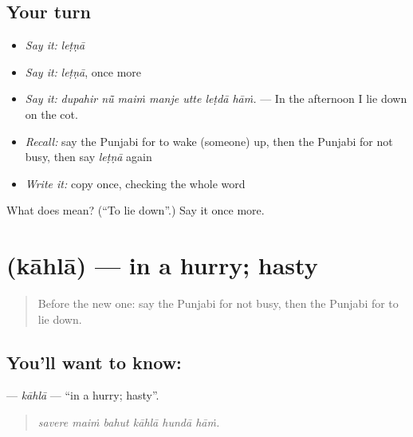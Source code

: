 \subsection*{Your turn}
\begin{itemize}
\raggedright
  \item \emph{Say it:} \emph{leṭṇā}
  \item \emph{Say it:} \emph{leṭṇā}, once more
  \item \emph{Say it:} \emph{dupahir nū̃ maiṁ manje utte leṭdā hāṁ.} — In the afternoon I lie down on the cot.
  \item \emph{Recall:} say the Punjabi for to wake (someone) up, then the Punjabi for not busy, then say \emph{leṭṇā} again
  \item \emph{Write it:} copy \textbf{} once, checking the whole word
\end{itemize}

\begin{tcolorbox}[breakable,colback=teal!4,colframe=teal!35!black,title={Before you move on}]
What does  mean? (\textquotedblleft{}To lie down\textquotedblright{}.) Say it once more.
\end{tcolorbox}
\section[\texorpdfstring{\pa{ਕਾਹਲਾ} (kāhlā)}{ਕਾਹਲਾ (kāhlā)}]{ (kāhlā) — in a hurry; hasty}

\label{lesson:PA-C225-kahla}



\begin{quote}
Before the new one: say the Punjabi for not busy, then the Punjabi for to lie down.
\end{quote}

\subsection*{You'll want to know: }
\textbf{} — \emph{kāhlā} — \textquotedblleft{}in a hurry; hasty\textquotedblright{}.

\begin{quote}
     
\end{quote}

\begin{quote}
\emph{savere maiṁ bahut kāhlā hundā hāṁ.}
\end{quote}

